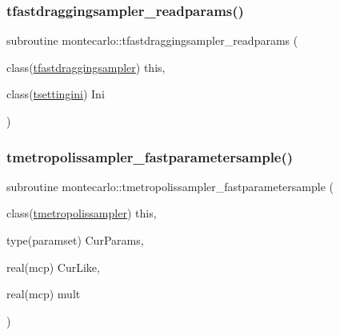 \mbox{\label{namespacemontecarlo_a80c9edc811cd8126c1af36c89008a779}} 
\subsubsection{\texorpdfstring{tfastdraggingsampler\+\_\+readparams()}{tfastdraggingsampler\_readparams()}}
{\footnotesize\ttfamily subroutine montecarlo\+::tfastdraggingsampler\+\_\+readparams (\begin{DoxyParamCaption}\item[{class(\mbox{\hyperlink{structmontecarlo_1_1tfastdraggingsampler}{tfastdraggingsampler}})}]{this,  }\item[{class(\mbox{\hyperlink{structsettings_1_1tsettingini}{tsettingini}})}]{Ini }\end{DoxyParamCaption})\hspace{0.3cm}{\ttfamily [private]}}

\mbox{\label{namespacemontecarlo_a52c8ac0f2608675d60fa454f684d0519}} 
\subsubsection{\texorpdfstring{tmetropolissampler\+\_\+fastparametersample()}{tmetropolissampler\_fastparametersample()}}
{\footnotesize\ttfamily subroutine montecarlo\+::tmetropolissampler\+\_\+fastparametersample (\begin{DoxyParamCaption}\item[{class(\mbox{\hyperlink{structmontecarlo_1_1tmetropolissampler}{tmetropolissampler}})}]{this,  }\item[{type(paramset)}]{Cur\+Params,  }\item[{real(mcp)}]{Cur\+Like,  }\item[{real(mcp)}]{mult }\end{DoxyParamCaption})\hspace{0.3cm}{\ttfamily [private]}}

\mbox{\label{namespacemontecarlo_a8e8eb524291ad6abaafc4ec1cedaa916}} 
